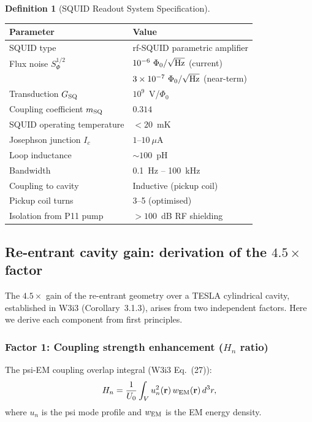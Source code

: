 \documentclass[11pt,twocolumn]{article}
\newcommand{\ee}[1]{\times 10^{#1}}
\newcommand{\Heff}{H_n}
\theoremstyle{definition}
\newtheorem{definition}[theorem]{Definition}
\theoremstyle{remark}
\begin{document}
\begin{definition}[SQUID Readout System Specification]
\label{def:squid}
\begin{center}
\renewcommand{\arraystretch}{1.2}
\begin{tabular}{@{}p{3.5cm}p{4.5cm}@{}}
\toprule
Parameter & Value \\
\midrule
SQUID type & rf-SQUID parametric amplifier \\
Flux noise $S_\Phi^{1/2}$ & $10^{-6}~\Phi_0/\sqrt{\rm Hz}$ (current) \\
& $3\ee{-7}~\Phi_0/\sqrt{\rm Hz}$ (near-term) \\
Transduction $G_{\rm SQ}$ & $10^9$~V/$\Phi_0$ \\
Coupling coefficient $m_{\rm SQ}$ & $0.314$ \\
SQUID operating temperature & $< 20$~mK \\
Josephson junction $I_c$ & $1$--$10~\mu$A \\
Loop inductance & $\sim 100$~pH \\
Bandwidth & 0.1~Hz -- 100~kHz \\
Coupling to cavity & Inductive (pickup coil) \\
Pickup coil turns & 3--5 (optimised) \\
Isolation from P11 pump & $> 100$~dB RF shielding \\
\bottomrule
\end{tabular}
\end{center}
\end{definition}

\subsection{Re-entrant cavity gain: derivation of the $4.5\times$ factor}
\label{sec:reentrant_gain}

The $4.5\times$ gain of the re-entrant geometry over a TESLA cylindrical
cavity, established in W3i3 (Corollary~3.1.3), arises from two independent
factors. Here we derive each component from first principles.

\subsubsection{Factor 1: Coupling strength enhancement ($H_n$ ratio)}
\label{sec:Hn_ratio}

The psi-EM coupling overlap integral (W3i3 Eq.~(27)):
\begin{equation}
\Heff = \frac{1}{U_0}\int_V u_n^2({\bf r})\,w_{\rm EM}({\bf r})\,d^3r,
\label{eq:Hn_integral}
\end{equation}
where $u_n$ is the psi mode profile and $w_{\rm EM}$ is the EM energy density.
\end{document}
